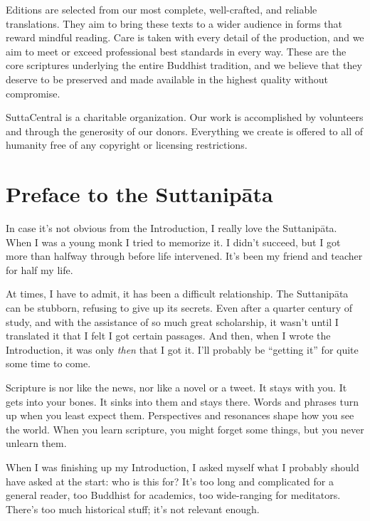 \documentclass[12pt,openany]{book}%
\begin{document}
Editions are selected from our most complete, well-crafted, and reliable translations. They aim to bring these texts to a wider audience in forms that reward mindful reading. Care is taken with every detail of the production, and we aim to meet or exceed professional best standards in every way. These are the core scriptures underlying the entire Buddhist tradition, and we believe that they deserve to be preserved and made available in the highest quality without compromise.

SuttaCentral is a charitable organization. Our work is accomplished by volunteers and through the generosity of our donors. Everything we create is offered to all of humanity free of any copyright or licensing restrictions. 

%
\chapter*{Preface to the \textsanskrit{Suttanipāta}}

In case it’s not obvious from the Introduction, I really love the \textsanskrit{Suttanipāta}. When I was a young monk I tried to memorize it. I didn’t succeed, but I got more than halfway through before life intervened. It’s been my friend and teacher for half my life.

At times, I have to admit, it has been a difficult relationship. The \textsanskrit{Suttanipāta} can be stubborn, refusing to give up its secrets. Even after a quarter century of study, and with the assistance of so much great scholarship, it wasn’t until I translated it that I felt I got certain passages. And then, when I wrote the Introduction, it was only \emph{then} that I got it. I’ll probably be “getting it” for quite some time to come.

Scripture is nor like the news, nor like a novel or a tweet. It stays with you. It gets into your bones. It sinks into them and stays there. Words and phrases turn up when you least expect them. Perspectives and resonances shape how you see the world. When you learn scripture, you might forget some things, but you never unlearn them.

When I was finishing up my Introduction, I asked myself what I probably should have asked at the start: who is this for? It’s too long and complicated for a general reader, too Buddhist for academics, too wide-ranging for meditators. There’s too much historical stuff; it’s not relevant enough.
\end{document}
